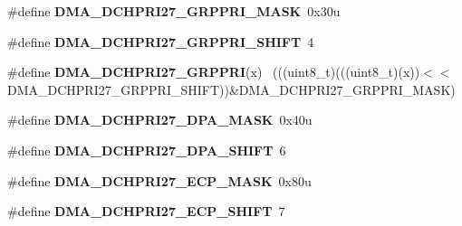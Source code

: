\begin{DoxyCompactItemize}
\item 
\hypertarget{group___d_m_a___register___masks_ga3ec5889434521b2060e01ad03d73ffc0}{}\#define {\bfseries D\+M\+A\+\_\+\+D\+C\+H\+P\+R\+I27\+\_\+\+G\+R\+P\+P\+R\+I\+\_\+\+M\+A\+S\+K}~0x30u\label{group___d_m_a___register___masks_ga3ec5889434521b2060e01ad03d73ffc0}

\item 
\hypertarget{group___d_m_a___register___masks_gae18ec9a0fa33664e01ed1abcd0b7bd83}{}\#define {\bfseries D\+M\+A\+\_\+\+D\+C\+H\+P\+R\+I27\+\_\+\+G\+R\+P\+P\+R\+I\+\_\+\+S\+H\+I\+F\+T}~4\label{group___d_m_a___register___masks_gae18ec9a0fa33664e01ed1abcd0b7bd83}

\item 
\hypertarget{group___d_m_a___register___masks_ga15f3c31874151e610ba78f5182d469c3}{}\#define {\bfseries D\+M\+A\+\_\+\+D\+C\+H\+P\+R\+I27\+\_\+\+G\+R\+P\+P\+R\+I}(x)                                  ~(((uint8\+\_\+t)(((uint8\+\_\+t)(x))$<$$<$D\+M\+A\+\_\+\+D\+C\+H\+P\+R\+I27\+\_\+\+G\+R\+P\+P\+R\+I\+\_\+\+S\+H\+I\+F\+T))\&D\+M\+A\+\_\+\+D\+C\+H\+P\+R\+I27\+\_\+\+G\+R\+P\+P\+R\+I\+\_\+\+M\+A\+S\+K)\label{group___d_m_a___register___masks_ga15f3c31874151e610ba78f5182d469c3}

\item 
\hypertarget{group___d_m_a___register___masks_gac55b1f915a2930f6e854663ad4814869}{}\#define {\bfseries D\+M\+A\+\_\+\+D\+C\+H\+P\+R\+I27\+\_\+\+D\+P\+A\+\_\+\+M\+A\+S\+K}~0x40u\label{group___d_m_a___register___masks_gac55b1f915a2930f6e854663ad4814869}

\item 
\hypertarget{group___d_m_a___register___masks_ga4eedb97cceb63c4c3069a3e026c5cc38}{}\#define {\bfseries D\+M\+A\+\_\+\+D\+C\+H\+P\+R\+I27\+\_\+\+D\+P\+A\+\_\+\+S\+H\+I\+F\+T}~6\label{group___d_m_a___register___masks_ga4eedb97cceb63c4c3069a3e026c5cc38}

\item 
\hypertarget{group___d_m_a___register___masks_ga036790ae10dbd2955d50361130be80a8}{}\#define {\bfseries D\+M\+A\+\_\+\+D\+C\+H\+P\+R\+I27\+\_\+\+E\+C\+P\+\_\+\+M\+A\+S\+K}~0x80u\label{group___d_m_a___register___masks_ga036790ae10dbd2955d50361130be80a8}

\item 
\hypertarget{group___d_m_a___register___masks_ga87cc7c7e3bed96fbc1790b40410f8542}{}\#define {\bfseries D\+M\+A\+\_\+\+D\+C\+H\+P\+R\+I27\+\_\+\+E\+C\+P\+\_\+\+S\+H\+I\+F\+T}~7\label{group___d_m_a___register___masks_ga87cc7c7e3bed96fbc1790b40410f8542}


\end{DoxyCompactItemize}
